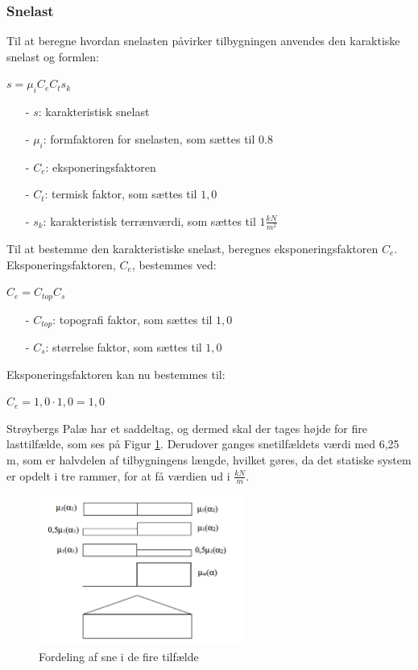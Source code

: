 \subsubsection{Snelast}
Til at beregne hvordan snelasten påvirker tilbygningen anvendes den karaktiske snelast og formlen:
\begin{center}
$s=\mu_iC_eC_ts_k$
\end{center}
\begin{itemize}
	\item[-] $s$: karakteristisk snelast
	\item[-] $\mu_i$: formfaktoren for snelasten, som sættes til 0.8 \citep[ tabel 5.2 kapitel 5.3]{EU91}
	\item[-] $C_e$: eksponeringsfaktoren
	\item[-] $C_t$: termisk faktor, som sættes til $1,\!0$ \citep[ kapitel 5.2]{EU91}
	\item[-] $s_k$: karakteristisk terrænværdi, som sættes til $1 \frac{kN}{m^2}$ \citep[ kapitel 4.1]{EU91}
\end{itemize}
Til at bestemme den karakteristiske snelast, beregnes eksponeringsfaktoren $C_e$.
\newline
\newline
Eksponeringsfaktoren, $C_e$, bestemmes ved:
\begin{center}
$C_e=C_{top}C_s$
\end{center}
\begin{itemize}
	\item[-] $C_{top}$: topografi faktor, som sættes til $1,\!0$ \citep[ tabel 5.1 kapitel 5.2]{EU91}
	\item[-] $C_s$: størrelse faktor, som sættes til $1,\!0$ \citep[ kapitel 5.2]{EU91}
\end{itemize}
Eksponeringsfaktoren kan nu bestemmes til:
\begin{center}
$C_e=1,\!0\cdot 1,\!0=1,\!0$
\end{center}
Strøybergs Palæ har et saddeltag, og dermed skal der tages højde for fire lasttilfælde, som ses på Figur \ref{fig:sne}. Derudover ganges snetilfældets værdi med 6,25 m, som er halvdelen af tilbygningens længde, hvilket gøres, da det statiske system er opdelt i tre rammer, for at få værdien ud i $\frac{kN}{m}$.

\begin{figure}[htbp]
	\centering
	\includegraphics[width=0.6\textwidth]{billeder/snelasttilfaelde.png}
	\caption{Fordeling af sne i de fire tilfælde}
	\label{fig:sne}
\end{figure}

